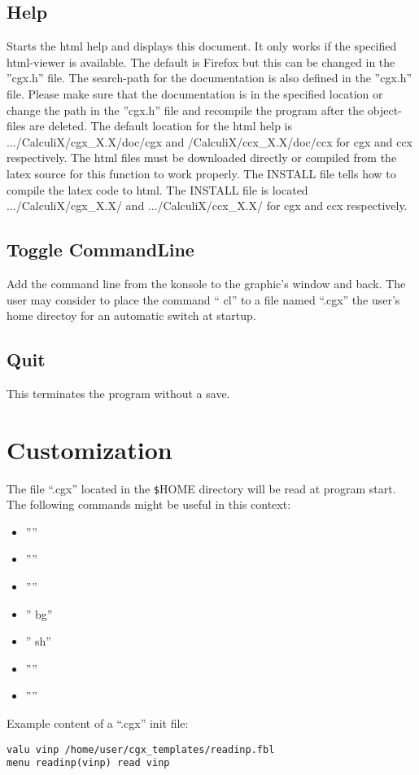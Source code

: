 \documentclass{article}
\begin{document}
\subsection{\label{Help}Help}
Starts the html help and displays this document. It only works if the specified html-viewer is available. The default is Firefox \cite{Firefox} but this can be changed in the ''cgx.h'' file. The search-path for the documentation is also defined in the ''cgx.h'' file. Please make sure that the documentation is in the specified location or change the path in the ''cgx.h'' file and recompile the program after the object-files are deleted.  The default location for the html help is .../CalculiX/cgx\_X.X/doc/cgx and /CalculiX/ccx\_X.X/doc/ccx for cgx and ccx respectively.  The html files must be downloaded directly or compiled from the latex source for this function to work properly. The INSTALL file tells how to compile the latex code to html.  The INSTALL file is located .../CalculiX/cgx\_X.X/ and .../CalculiX/ccx\_X.X/ for cgx and ccx respectively.

\subsection{\label{Toggle CommandLine}Toggle CommandLine}
Add the command line from the konsole to the graphic's window and back. The user may consider to place the command `` cl'' to a file named ``.cgx'' the user's home directoy for an automatic switch at startup.

\subsection{\label{Quit}Quit}
This terminates the program without a save.

\section{\label{Customization}Customization}
The file ``.cgx'' located in the \verb_$_HOME directory will be read at program start. The following commands might be useful in this context: 
\begin{itemize}
\item ''''
\item ''''
\item ''''
\item '' bg''
\item '' sh''
\item ''''
\item ''''
\end{itemize}
Example content of a ``.cgx'' init file:
\begin{verbatim}
valu vinp /home/user/cgx_templates/readinp.fbl
menu readinp(vinp) read vinp
\end{verbatim}
\end{document}

